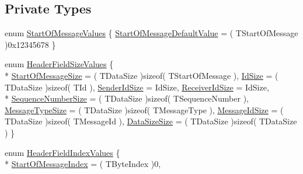 \subsection*{Private Types}
\begin{DoxyCompactItemize}
\item 
enum \hyperlink{class_terra_swarm_1_1_message_header_acc3f58a1107fca3a112e3b68b80be3bf}{Start\-Of\-Message\-Values} \{ \hyperlink{class_terra_swarm_1_1_message_header_acc3f58a1107fca3a112e3b68b80be3bfa4f866bfd6f54d1a723c05eea30a17e6d}{Start\-Of\-Message\-Default\-Value} = ( T\-Start\-Of\-Message )0x12345678
 \}
\item 
enum \hyperlink{class_terra_swarm_1_1_message_header_a189acad5bd9f60fe47b3381da62d3484}{Header\-Field\-Size\-Values} \{ \\*
\hyperlink{class_terra_swarm_1_1_message_header_a189acad5bd9f60fe47b3381da62d3484a66c01670e26436cba7028bb19c238cef}{Start\-Of\-Message\-Size} = ( T\-Data\-Size )sizeof( T\-Start\-Of\-Message ), 
\hyperlink{class_terra_swarm_1_1_message_header_a189acad5bd9f60fe47b3381da62d3484a9c06599a19b72607a6244f5d30a7bc0a}{Id\-Size} = ( T\-Data\-Size )sizeof( T\-Id ), 
\hyperlink{class_terra_swarm_1_1_message_header_a189acad5bd9f60fe47b3381da62d3484a51b6e5f4bb02d1e98de93c3de237bf3c}{Sender\-Id\-Size} = Id\-Size, 
\hyperlink{class_terra_swarm_1_1_message_header_a189acad5bd9f60fe47b3381da62d3484aa9ca8b3cb72a1ff173d84c8ca71f96d5}{Receiver\-Id\-Size} = Id\-Size, 
\\*
\hyperlink{class_terra_swarm_1_1_message_header_a189acad5bd9f60fe47b3381da62d3484ab930e6de45a4e449f3a576e38ba4d3a5}{Sequence\-Number\-Size} = ( T\-Data\-Size )sizeof( T\-Sequence\-Number ), 
\hyperlink{class_terra_swarm_1_1_message_header_a189acad5bd9f60fe47b3381da62d3484ad45da22415ac87cda0dc06e3e6047947}{Message\-Type\-Size} = ( T\-Data\-Size )sizeof( T\-Message\-Type ), 
\hyperlink{class_terra_swarm_1_1_message_header_a189acad5bd9f60fe47b3381da62d3484a9008a5ec8c433f7c7f74c1c150581ea2}{Message\-Id\-Size} = ( T\-Data\-Size )sizeof( T\-Message\-Id ), 
\hyperlink{class_terra_swarm_1_1_message_header_a189acad5bd9f60fe47b3381da62d3484a3ef403fe13fcd865a980e28ad63dac48}{Data\-Size\-Size} = ( T\-Data\-Size )sizeof( T\-Data\-Size )
 \}
\item 
enum \hyperlink{class_terra_swarm_1_1_message_header_a2a96f83a96cfee0465da982814cb372a}{Header\-Field\-Index\-Values} \{ \\*
\hyperlink{class_terra_swarm_1_1_message_header_a2a96f83a96cfee0465da982814cb372aa74b66ff4fa355a80faf96e67ce47f679}{Start\-Of\-Message\-Index} = ( T\-Byte\-Index )0, 

\end{DoxyCompactItemize}
